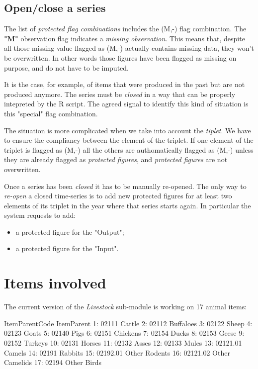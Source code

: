 \documentclass[nojss]{jss}
\begin{document}
\subsection{Open/close a series}
The list of \textit{protected flag combinations} includes the (M,-) flag combination. The \textbf{"M"} observation flag indicates a \textit{missing observation}. This means that, despite all those missing value flagged as (M,-) actually contains missing data, they won't be overwritten. In other words those figures have been flagged as missing on purpose, and do not have to be imputed.

It is the case, for example, of items that were produced in the past but are not produced anymore. The series must be \textit{closed} in a way that can be properly intepreted by the R script. The agreed signal to identify this kind of situation is this "special" flag combination.

The situation is more complicated when we take into account the \textit{tiplet}. We have to ensure the compliancy between the element of the triplet. If one element of the triplet is flagged as (M,-) all the others are authomatically flagged as (M,-) unless they are already flagged as \textit{protected figures}, and \textit{protected figures} are not overwritten. 

Once a series has been \textit{closed} it has to be manually re-opened. The only way to \textit{re-open} a closed time-series is to add new protected figures for at least two elements of its triplet in the year where that series starts again. In particular the system requests to add:
\begin{itemize}
\item a protected figure for the "Output";
\item a protected figure for the "Input".
\end{itemize}



\section{Items involved}

The current version of the \textit{Livestock} sub-module is working on 17 animal items:

\begin{Schunk}
\begin{Soutput}
    ItemParentCode     ItemParent
 1:          02111         Cattle
 2:          02112      Buffaloes
 3:          02122          Sheep
 4:          02123          Goats
 5:          02140           Pigs
 6:          02151       Chickens
 7:          02154          Ducks
 8:          02153          Geese
 9:          02152        Turkeys
10:          02131         Horses
11:          02132          Asses
12:          02133          Mules
13:       02121.01         Camels
14:          02191        Rabbits
15:       02192.01  Other Rodents
16:       02121.02 Other Camelids
17:          02194    Other Birds
\end{Soutput}
\end{Schunk}
\end{document}
